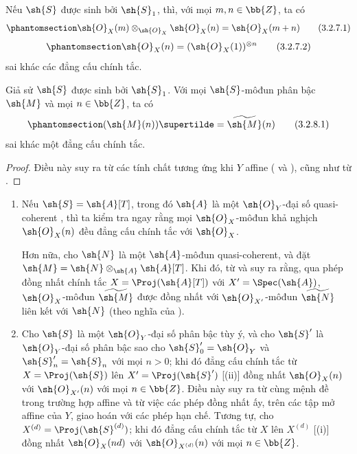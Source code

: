 \documentclass[oneside,10pt]{amsart}
\newcommand{\oldpage}[2][]{\marginnote{\normalfont\footnotesize\textbf{#1}~|~#2}\ignorespaces}
\let\EGAOriginalLabel\label
\renewcommand{\label}[1]{\phantomsection\EGAOriginalLabel{#1}}
\begin{document}
\begin{corollary}[3.2.7]
\label{II.3.2.7}
Nếu $\sh{S}$ được sinh bởi $\sh{S}_1$, thì, với mọi $m,n\in\bb{Z}$, ta có
\[
\label{II.3.2.7.1}
  \sh{O}_X(m)\otimes_{\sh{O}_X}\sh{O}_X(n)=\sh{O}_X(m+n)
\tag{3.2.7.1}
\]
\[
\label{II.3.2.7.2}
  \sh{O}_X(n)=(\sh{O}_X(1))^{\otimes n}
\tag{3.2.7.2}
\]
sai khác các đẳng cấu chính tắc.
\end{corollary}
\oldpage[II]{56}

\begin{corollary}[3.2.8]
\label{II.3.2.8}
Giả sử $\sh{S}$ được sinh bởi $\sh{S}_1$.
Với mọi $\sh{S}$-môđun phân bậc $\sh{M}$ và mọi $n\in\bb{Z}$, ta có
\[
\label{II.3.2.8.1}
  (\sh{M}(n))\supertilde=\widetilde{\sh{M}}(n)
\tag{3.2.8.1}
\]
sai khác một đẳng cấu chính tắc.
\end{corollary}

\begin{proof}
Điều này suy ra từ các tính chất tương ứng khi $Y$ affine ( và ), cũng như từ .
\end{proof}

\begin{remarks}[3.2.9]
\label{II.3.2.9}
\medskip\noindent
\begin{enumerate}
  \item[\rm{(i)}] Nếu $\sh{S}=\sh{A}[T]$, trong đó $\sh{A}$ là một $\sh{O}_Y$-đại số quasi-coherent , thì ta kiểm tra ngay rằng mọi $\sh{O}_X$-môđun khả nghịch $\sh{O}_X(n)$ đều đẳng cấu chính tắc với $\sh{O}_X$.

  Hơn nữa, cho $\sh{N}$ là một $\sh{A}$-môđun quasi-coherent, và đặt $\sh{M}=\sh{N}\otimes_{\sh{A}}\sh{A}[T]$.
  Khi đó, từ  và  suy ra rằng, qua phép đồng nhất chính tắc $X=\Proj(\sh{A}[T])$ với $X'=\Spec(\sh{A})$, $\sh{O}_X$-môđun $\widetilde{\sh{M}}$ được đồng nhất với $\sh{O}_{X'}$-môđun $\widetilde{\sh{N}}$ liên kết với $\sh{N}$ (theo nghĩa của ).
  \item[\rm{(ii)}] Cho $\sh{S}$ là một $\sh{O}_Y$-đại số phân bậc tùy ý, và cho $\sh{S}'$ là $\sh{O}_Y$-đại số phân bậc sao cho $\sh{S}'_0=\sh{O}_Y$ và $\sh{S}'_n=\sh{S}_n$ với mọi $n>0$;
  khi đó đẳng cấu chính tắc từ $X=\Proj(\sh{S})$ lên $X'=\Proj(\sh{S}')$ [(ii)] đồng nhất $\sh{O}_X(n)$ với $\sh{O}_{X'}(n)$ với mọi $n\in\bb{Z}$.
  Điều này suy ra từ cùng mệnh đề trong trường hợp affine  và từ việc các phép đồng nhất ấy, trên các tập mở affine của $Y$, giao hoán với các phép hạn chế.
  Tương tự, cho $X^{(d)}=\Proj(\sh{S}^{(d)})$;
  khi đó đẳng cấu chính tắc từ $X$ lên $X^{(d)}$ [(i)] đồng nhất $\sh{O}_X(nd)$ với $\sh{O}_{X^{(d)}}(n)$ với mọi $n\in\bb{Z}$.
\end{enumerate}
\end{remarks}
\end{document}
